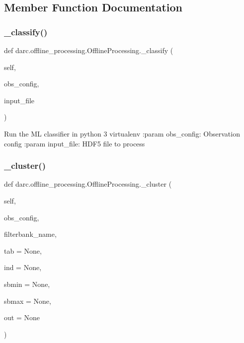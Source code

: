 \subsection{Member Function Documentation}
\mbox{\label{classdarc_1_1offline__processing_1_1_offline_processing_a2353ffe1274b3217edd28839bdaa2f41}} 
\subsubsection{\texorpdfstring{\_classify()}{\_classify()}}
{\footnotesize\ttfamily def darc.\+offline\+\_\+processing.\+Offline\+Processing.\+\_\+classify (\begin{DoxyParamCaption}\item[{}]{self,  }\item[{}]{obs\+\_\+config,  }\item[{}]{input\+\_\+file }\end{DoxyParamCaption})\hspace{0.3cm}{\ttfamily [private]}}

\begin{DoxyVerb}Run the ML classifier in python 3 virtualenv
:param obs_config: Observation config
:param input_file: HDF5 file to process
\end{DoxyVerb}
 \mbox{\label{classdarc_1_1offline__processing_1_1_offline_processing_a1cfab9b2b2b47612dbf26ade9f3c36a4}} 
\subsubsection{\texorpdfstring{\_cluster()}{\_cluster()}}
{\footnotesize\ttfamily def darc.\+offline\+\_\+processing.\+Offline\+Processing.\+\_\+cluster (\begin{DoxyParamCaption}\item[{}]{self,  }\item[{}]{obs\+\_\+config,  }\item[{}]{filterbank\+\_\+name,  }\item[{}]{tab = {\ttfamily None},  }\item[{}]{ind = {\ttfamily None},  }\item[{}]{sbmin = {\ttfamily None},  }\item[{}]{sbmax = {\ttfamily None},  }\item[{}]{out = {\ttfamily None} }\end{DoxyParamCaption})\hspace{0.3cm}{\ttfamily [private]}}

